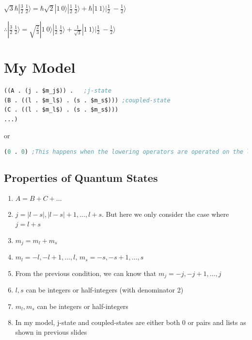 \documentclass[
paper=128mm:96mm, %
fontsize=11pt, %
pagesize, %
parskip=half-, %
]{scrartcl} %
\theoremstyle{mythmstyle} %
\begin{document}
$\sqrt{3} \hbar |\frac{3}{2}\ \frac{1}{2}\rangle = \hbar \sqrt{2} |1\ 0\rangle |\frac{1}{2}\ \frac{1}{2}\rangle + \hbar |1\ 1\rangle |\frac{1}{2}\ -\frac{1}{2}\rangle$

$\therefore |\frac{3}{2}\ \frac{1}{2}\rangle = \sqrt{\frac{2}{3}} |1\ 0\rangle |\frac{1}{2}\ \frac{1}{2}\rangle + \frac{1}{\sqrt{3}} |1\ 1\rangle |\frac{1}{2}\ -\frac{1}{2}\rangle$


\clearpage

\section{My Model}

\begin{lstlisting}[language=Lisp,breaklines=true,mathescape]
((A . (j . $m_j$)) .   ;j-state
(B . ((l . $m_l$) . (s . $m_s$))) ;coupled-state
(C . ((l . $m_l$) . (s . $m_s$)))
...)
\end{lstlisting}

or

\begin{lstlisting}[language=Lisp,breaklines=true,mathescape]
(0 . 0) ;This happens when the lowering operators are operated on the lowest states
\end{lstlisting}

\clearpage


\subsection{Properties of Quantum States}

\begin{enumerate}

\item $A=B+C+ \ldots$

\item $j= |l-s|, |l-s|+1, ... ,l+s$. But here we only consider the case where $j=l+s$

\item $m_j=m_l+m_s$

\item $m_l= -l ,-l+1 ,..., l$, $m_s = -s,-s+1, ... ,s$

\item From the previous condition, we can know that $m_j= -j, -j+1 ,... ,j$

\item $l,s$ can be integers or half-integers (with denominator 2)

\item $m_l, m_s$ can be integers or half-integers

\item In my model, j-state and coupled-states are either both 0 or pairs and lists as shown in previous slides

\end{enumerate}
\clearpage
\end{document}
